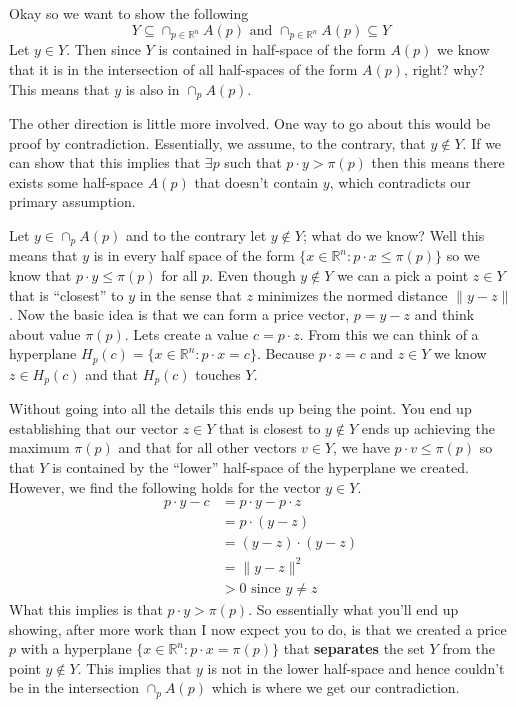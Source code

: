 \documentclass[a4paper,12pt]{article}
\begin{document}
Okay so we want to show the following
\[
	Y \subseteq \cap_{p \in \mathbb{R}^n} A(p) \text{ and } \cap_{p \in \mathbb{R}^n} A(p) \subseteq Y
\]
Let $y \in Y$. Then since $Y$ is contained in  half-space of the form $A(p)$ we know that it is in the intersection of all half-spaces of the form $A(p)$, right? why?
This means that $y$ is also in $\cap_p A(p)$.

The other direction is little more involved.
One way to go about this would be proof by contradiction.
Essentially, we assume, to the contrary, that $y \notin Y$.
If we can show that this implies that $\exists p$ such that $p\cdot y > \pi(p)$ then this means there exists some half-space $A(p)$ that doesn't contain $y$, which contradicts our primary assumption.

Let $y \in \cap_p A(p)$ and to the contrary let $y \notin Y$; what do we know?
Well this means that $y$ is in every half space of the form $\{ x \in \mathbb{R}^n : p\cdot x \leq \pi(p)\}$ so we know that $p\cdot y \leq \pi(p)$ for all $p$.
Even though $y \notin Y$ we can a pick a point $z\in Y$ that is ``closest'' to $y$ in the sense that $z$ minimizes the normed distance $\| y - z \|$.
Now the basic idea is that we can form a price vector, $p = y - z$ and think about value $\pi(p)$.
Lets create a value $c = p\cdot z$.
From this we can think of a hyperplane $H_{p}(c) = \{ x \in \mathbb{R}^n : p\cdot x = c \}$.
Because $p\cdot z = c$ and $z \in Y$ we know $z \in H_p(c)$ and that $H_p(c)$ touches $Y$.

Without going into all the details this ends up being the point.
You end up establishing that our vector $z \in Y$ that is closest to $y \notin Y$ ends up achieving the maximum $\pi(p)$ and that for all other vectors $v \in Y$, we have $p\cdot v \leq \pi(p)$ so that $Y$ is contained by the ``lower'' half-space of the hyperplane we created.
However, we find the following holds for the vector $y\in Y$.
\begin{align}
	p\cdot y - c &= p\cdot y - p\cdot z \nonumber \\
	&= p\cdot (y - z) \nonumber \\
	&= (y - z)\cdot (y - z) \nonumber \\
	&= \| y - z \|^2  \nonumber \\
	&> 0 \text{ since } y \neq z \nonumber 
\end{align}
What this implies is that $p\cdot y > \pi(p)$.
So essentially what you'll end up showing, after more work than I now expect you to do, is that we created a price $p$ with a hyperplane $\{ x \in \mathbb{R}^n : p\cdot x = \pi(p)\}$ that \textbf{separates} the set $Y$ from the point $y\notin Y$.
This implies that $y$ is not in the lower half-space and hence couldn't be in the intersection $\cap_p A(p)$ which is where we get our contradiction.
\end{document}
